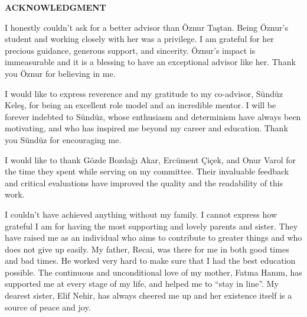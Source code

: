 \clearpage
\setlength{\parindent}{0pt}
\begin{center}
	\MakeUppercase{\textbf{acknowledgment}} \\ [3\baselineskip]
\end{center}

I honestly couldn't ask for a better advisor than Öznur Taştan.
Being Öznur's student and working closely with her was a privilege.
I am grateful for her precious guidance, generous support, and sincerity.
Öznur's impact is immeasurable and it is a blessing to have an exceptional advisor like her.
Thank you Öznur for believing in me.

I would like to express reverence and my gratitude to my co-advisor, Sündüz Keleş, for being an excellent role model and an incredible mentor.
I will be forever indebted to Sündüz, whose enthusiasm and determinism have always been motivating, and who has inspired me beyond my career and education.
Thank you Sündüz for encouraging me.


I would like to thank Gözde Bozdağı Akar, Ercüment Çiçek, and Onur Varol for the time they spent while serving on my committee.
Their invaluable feedback and critical evaluations have improved the quality and the readability of this work.


I couldn't have achieved anything without my family.
I cannot express how grateful I am for having the most supporting and lovely parents and sister.
They have raised me as an individual who aims to contribute to greater things and who does not give up easily.
My father, Recai, was there for me in both good times and bad times.
He worked very hard to make sure that I had the best education possible.
The continuous and unconditional love of my mother, Fatma Hanım, has supported me at every stage of my life, and helped me to ``stay in line''.
My dearest sister, Elif Nehir, has always cheered me up and her existence itself is a source of peace and joy.

